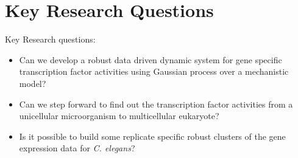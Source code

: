 \section{Key Research Questions}

Key Research questions:
\begin{itemize} 
\item Can we develop a robust data driven dynamic system for gene specific transcription factor 
 activities using Gaussian process over a mechanistic model?
\item Can we step forward to find out the transcription factor activities from a unicellular 
microorganism to multicellular eukaryote?
\item Is it possible to build some replicate specific robust clusters of the gene expression data for \textit{C. elegans}?
\end{itemize} 


